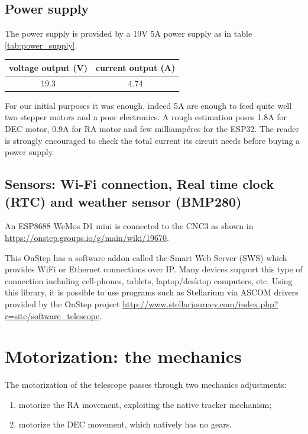 \documentclass{article}
\begin{document}
\begin{multicols}{2}
        \subsection{Power supply}
        The power supply is provided by a 19V 5A power supply as in table \ref{tab:power_supply}.

        \begin{minipage}
            {.4\textwidth}
            \begin{tabular}{cc}
                 voltage output (V) & current output (A) \\
                 \hline
                19.3 & 4.74 \\
            \end{tabular}
            \label{tab:power_supply}
        \end{minipage}

        For our initial purposes it was enough, indeed 5A are enough to feed quite well two stepper motors and a poor electronics.
        A rough estimation poses 1.8A for DEC motor, 0.9A for RA motor and few milliampéres for the ESP32. 
        The reader is strongly encouraged to check the total current its circuit needs before buying a power supply.

        \subsection{Sensors: Wi-Fi connection, Real time clock (RTC) and weather sensor (BMP280)}
        An ESP8688 WeMos D1 mini is connected to the CNC3 as shown in \url{https://onstep.groups.io/g/main/wiki/19670}.

        This OnStep has a software addon called the Smart Web Server (SWS) which provides WiFi or Ethernet connections over IP.
        Many devices support this type of connection including cell-phones, tablets, laptop/desktop computers, etc.
        Using this library, it is possible to use programs such as Stellarium via ASCOM drivers provided by the OnStep project \url{http://www.stellarjourney.com/index.php?r=site/software_telescope}.

        \section{Motorization: the mechanics}
        The motorization of the telescope passes through two mechanics adjustments:
        \begin{enumerate}
            \item motorize the RA movement, exploiting the native tracker mechanism;
            \item motorize the DEC movement, which natively has no gears.
        \end{enumerate}


\end{multicols}
\end{document}
